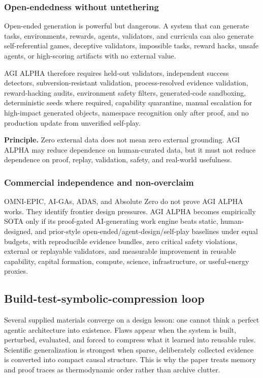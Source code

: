 \documentclass[
  11pt,
]{article}
\begin{document}
\subsubsection{Open-endedness without
untethering}\label{open-endedness-without-untethering}

Open-ended generation is powerful but dangerous. A system that can
generate tasks, environments, rewards, agents, validators, and curricula
can also generate self-referential games, deceptive validators,
impossible tasks, reward hacks, unsafe agents, or high-scoring artifacts
with no external value.

AGI ALPHA therefore requires held-out validators, independent success
detectors, subversion-resistant validation, process-resolved evidence
validation, reward-hacking audits, environment safety filters,
generated-code sandboxing, deterministic seeds where required,
capability quarantine, manual escalation for high-impact generated
objects, namespace recognition only after proof, and no production
update from unverified self-play.

\textbf{Principle.} Zero external data does not mean zero external
grounding. AGI ALPHA may reduce dependence on human-curated data, but it
must not reduce dependence on proof, replay, validation, safety, and
real-world usefulness.

\subsubsection{Commercial independence and
non-overclaim}\label{commercial-independence-and-non-overclaim-1}

OMNI-EPIC, AI-GAs, ADAS, and Absolute Zero do not prove AGI ALPHA works.
They identify frontier design pressures. AGI ALPHA becomes empirically
SOTA only if its proof-gated AI-generating work engine beats static,
human-designed, and prior-style open-ended/agent-design/self-play
baselines under equal budgets, with reproducible evidence bundles, zero
critical safety violations, external or replayable validators, and
measurable improvement in reusable capability, capital formation,
compute, science, infrastructure, or useful-energy proxies.

\subsection{Build-test-symbolic-compression
loop}\label{build-test-symbolic-compression-loop}

Several supplied materials converge on a design lesson: one cannot think
a perfect agentic architecture into existence. Flaws appear when the
system is built, perturbed, evaluated, and forced to compress what it
learned into reusable rules. Scientific generalization is strongest when
sparse, deliberately collected evidence is converted into compact causal
structure. This is why the paper treats memory and proof traces as
thermodynamic order rather than archive clutter.
\end{document}
